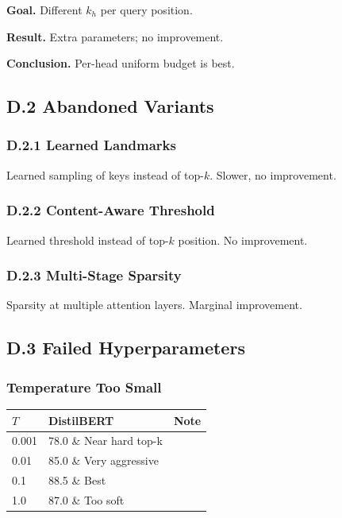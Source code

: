 \textbf{Goal.} Different $k_h$ per query position.

\textbf{Result.} Extra parameters; no improvement.

\textbf{Conclusion.} Per-head uniform budget is best.

\subsection{D.2 Abandoned Variants}

\subsubsection{D.2.1 Learned Landmarks}

Learned sampling of keys instead of top-$k$. Slower, no improvement.

\subsubsection{D.2.2 Content-Aware Threshold}

Learned threshold instead of top-$k$ position. No improvement.

\subsubsection{D.2.3 Multi-Stage Sparsity}

Sparsity at multiple attention layers. Marginal improvement.

\subsection{D.3 Failed Hyperparameters}

\subsubsection{Temperature Too Small}
\begin{table}[H]
\centering
\small
\begin{tabular}{lll}
\toprule
\textbf{$T$} & \textbf{DistilBERT} & \textbf{Note} \\
\midrule
0.001 & 78.0 \& Near hard top-k \\
0.01 & 85.0 \& Very aggressive \\
0.1 & 88.5 \& Best \\
1.0 & 87.0 \& Too soft \\
\bottomrule
\end{tabular}
\end{table}

